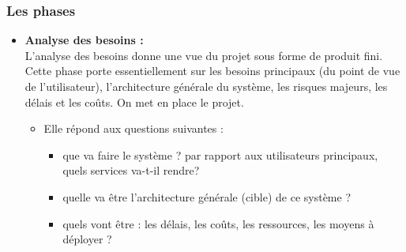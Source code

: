 \documentclass[12 pt ]{report}
\begin{document}
\subsubsection{Les phases }
\begin{itemize}[font=\color{black} \Large, label=]
\item \textbf{Analyse des besoins :}
\\
L'analyse des besoins donne une vue du projet sous forme de produit fini. Cette phase porte essentiellement sur les besoins principaux (du point de vue de l'utilisateur), l'architecture générale du système, les risques majeurs, les délais et les coûts. On met en place le projet.

\begin{itemize}[font=\color{black} \Large, label=]
\item Elle répond aux questions suivantes :
\begin{itemize}[font=\color{black} \Large, label=]
\item que va faire le système ? par rapport aux utilisateurs principaux, quels services va-t-il rendre?
\item quelle va être l'architecture générale (cible) de ce système ?
\item quels vont être : les délais, les coûts, les ressources, les moyens à déployer ?
\end{itemize}
\end{itemize}

\end{itemize}
\end{document}
